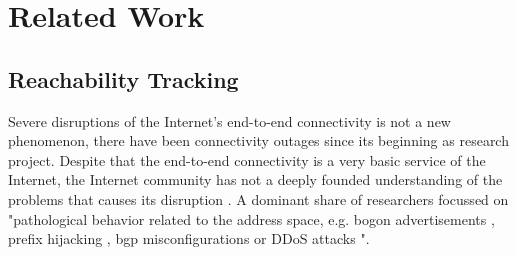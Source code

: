 \section{Related Work 
\label{sec:related_work}}

\subsection{Reachability
Tracking}

Severe disruptions of the Internet's end-to-end connectivity is not a new
phenomenon, there have been connectivity outages since its beginning as
research project. Despite that the end-to-end connectivity is a very basic
service of the Internet, the Internet community has not a deeply founded
understanding of the problems that causes its disruption \citep{Bush:Optometry}.
A dominant share of researchers focussed on "pathological behavior related to
the address space, e.g. bogon advertisements \citep{Feamster:2005}, prefix
hijacking \citep{Zhang:2010}, \gls{bgp} misconfigurations \citep{Mahajan:2002} 
or \gls{DDoS} attacks \citep{Chen:2001}"\citep{Bush:Optometry}.

